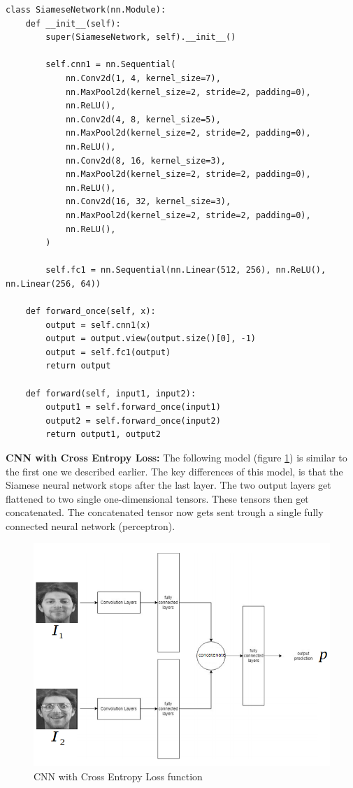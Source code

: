\begin{lstlisting}[caption={Code for CNN with Contrastive Loss}, label={lst:cnncl}, frame=single, breaklines=true]
class SiameseNetwork(nn.Module):
    def __init__(self):
        super(SiameseNetwork, self).__init__()

        self.cnn1 = nn.Sequential(
            nn.Conv2d(1, 4, kernel_size=7),
            nn.MaxPool2d(kernel_size=2, stride=2, padding=0),
            nn.ReLU(),
            nn.Conv2d(4, 8, kernel_size=5),
            nn.MaxPool2d(kernel_size=2, stride=2, padding=0),
            nn.ReLU(),
            nn.Conv2d(8, 16, kernel_size=3),
            nn.MaxPool2d(kernel_size=2, stride=2, padding=0),
            nn.ReLU(),
            nn.Conv2d(16, 32, kernel_size=3),
            nn.MaxPool2d(kernel_size=2, stride=2, padding=0),
            nn.ReLU(),
        )

        self.fc1 = nn.Sequential(nn.Linear(512, 256), nn.ReLU(), nn.Linear(256, 64))

    def forward_once(self, x):
        output = self.cnn1(x)
        output = output.view(output.size()[0], -1)
        output = self.fc1(output)
        return output

    def forward(self, input1, input2):
        output1 = self.forward_once(input1)
        output2 = self.forward_once(input2)
        return output1, output2
\end{lstlisting}

\textbf{CNN with Cross Entropy Loss:} The following model (figure \ref{fig:cnncel}) is similar to the first one we described earlier. The key differences of this model, is that the Siamese neural network stops after the last layer. The two output layers get flattened to two single one-dimensional tensors. These tensors then get concatenated. The concatenated tensor now gets sent trough a single fully connected neural network (perceptron).\\

\begin{figure}[H]
  \includegraphics[scale=0.7]{fig/cnncel.png}
  \centering
  \caption{CNN with Cross Entropy Loss function}
  \label{fig:cnncel}
\end{figure}


